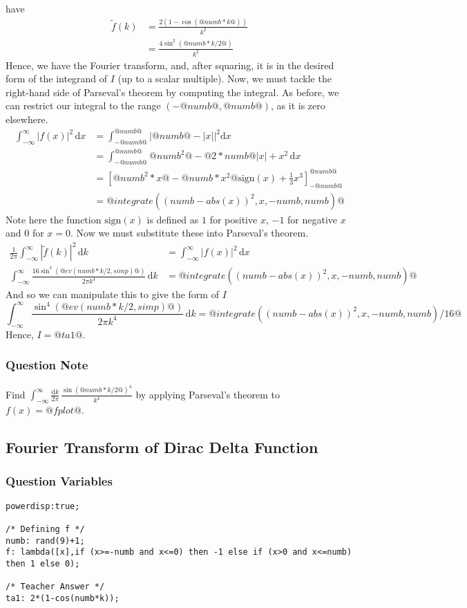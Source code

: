 \documentclass[a4paper,10pt]{article}
\begin{document}
have \begin{align*} \tilde{f}(k) &= \frac{2(1-\cos(@numb*k@))}{k^2} \\ &= \frac{4\sin^2(@numb*k/2@)}{k^2} \end{align*} Hence, we have the Fourier transform, and, after squaring, it is in the desired form of the integrand of $I$ (up to a scalar multiple). Now, we must tackle the right-hand side of Parseval's theorem by computing the integral. As before, we can restrict our integral to the range $(-@numb@,@numb@)$, as it is zero elsewhere. \begin{align*} \int_{-\infty}^{\infty} |f(x)|^2 \, \text{d}x &= \int_{-@numb@}^{@numb@} |@numb@-|x||^2 \text{d}x \\ &= \int_{-@numb@}^{@numb@}@numb^2@-@2*numb@|x|+x^2 \, \text{d}x \\ &= \left[@numb^2*x@-@numb*x^2@\text{sign}(x)+\frac{1}{3}x^3\right]_{-@numb@}^{@numb@} \\ &= @integrate((numb-abs(x))^2,x,-numb,numb)@ \end{align*} Note here the function $\text{sign}(x)$ is defined as $1$ for positive $x$, $-1$ for negative $x$ and $0$ for $x=0$. Now we must substitute these into Parseval's theorem. \begin{align*} \frac{1}{2\pi}\int_{-\infty}^{\infty} |\tilde{f}(k)|^2 \, \text{d}k &= \int_{-\infty}^{\infty} |f(x)|^2 \, \text{d}x \\ \int_{-\infty}^{\infty} \frac{16\sin^4(@ev(numb*k/2, simp)@)}{2\pi k^4} \, \text{d}k &= @integrate((numb-abs(x))^2,x,-numb,numb)@ \end{align*} And so we can manipulate this to give the form of $I$ \[ \int_{-\infty}^{\infty} \frac{\sin^4(@ev(numb*k/2, simp)@)}{2\pi k^4} \, \text{d}k = @integrate((numb-abs(x))^2,x,-numb,numb)/16@ \] Hence, $I = @ta1@$.
\subsubsection{Question Note}
Find \(\int_{-\infty}^{\infty}\frac{\text{d}k}{2\pi} \, \frac{\sin(@numb*k/2@)^4}{k^4}\) by applying Parseval's theorem to \(f(x) = @fplot@\).

\subsection{Fourier Transform of Dirac Delta Function}
\subsubsection{Question Variables}
\begin{lstlisting}
powerdisp:true;

/* Defining f */
numb: rand(9)+1;
f: lambda([x],if (x>=-numb and x<=0) then -1 else if (x>0 and x<=numb) then 1 else 0);

/* Teacher Answer */
ta1: 2*(1-cos(numb*k));
\end{lstlisting}
\end{document}
